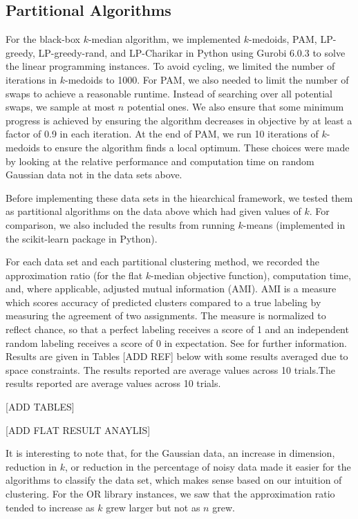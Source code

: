 \documentclass[conference, 10pt, final]{IEEEtran}
\begin{document}
\subsection{Partitional Algorithms}
 For the black-box $k$-median algorithm, we implemented $k$-medoids, PAM, LP-greedy, LP-greedy-rand, and LP-Charikar in Python using Gurobi 6.0.3 to solve the linear programming instances. 
To avoid cycling, we limited the number of iterations in $k$-medoids to 1000. For PAM, we also needed to limit the number of swaps to achieve a reasonable runtime. Instead of searching over all potential swaps, we sample at most $n$ potential ones. We also ensure that some minimum progress is achieved by ensuring the algorithm decreases in objective by at least a factor of 0.9 in each iteration. At the end of PAM, we run 10 iterations of $k$-medoids to ensure the algorithm finds a local optimum. These choices were made by looking at the relative performance and computation time on random Gaussian data not in the data sets above.

Before implementing these data sets in the hiearchical framework, we tested them as partitional algorithms on the data above which had given values of $k$. For comparison, we also included the results from running $k$-means (implemented in the scikit-learn package in Python). 

For each data set and each partitional clustering method, we recorded the approximation ratio (for the flat $k$-median objective function), computation time, and, where applicable, adjusted mutual information (AMI).  AMI is a measure which scores accuracy of predicted clusters compared to a true labeling by measuring the agreement of two assignments. The measure is normalized to reflect chance, so that a perfect labeling receives a score of 1 and an independent random labeling receives a score of 0 in expectation.  See \cite{Vinh} for further information.  Results are given in Tables [ADD REF]  below with some results averaged due to space constraints. The results reported are average values across 10 trials.The results reported are average values across 10 trials.

[ADD TABLES]

[ADD FLAT RESULT ANAYLIS]

It is interesting to note that, for the Gaussian data, an increase in dimension, reduction in $k$, or reduction in the percentage of noisy data made it easier for the algorithms to classify the data set, which makes sense based on our intuition of clustering. For the OR library instances, we saw that the approximation ratio tended to increase as $k$ grew larger but not as $n$ grew. 
\end{document}
